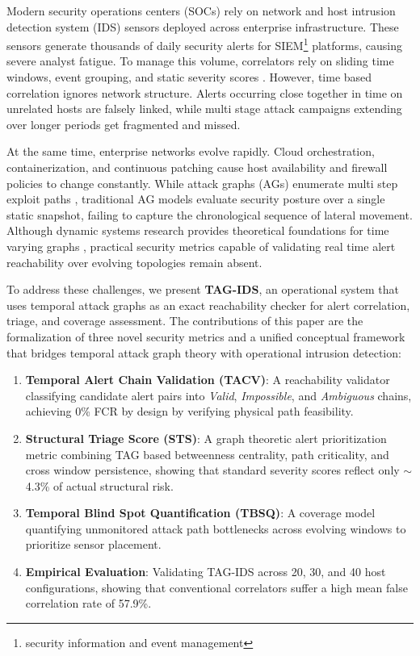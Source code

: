 \documentclass[runningheads]{llncs}
\begin{document}
Modern security operations centers (SOCs) rely on network and host intrusion detection system (IDS) sensors deployed across enterprise infrastructure. These sensors generate thousands of daily security alerts for SIEM\footnote{security information and event management} platforms, causing severe analyst fatigue. To manage this volume, correlators rely on sliding time windows, event grouping, and static severity scores \cite{10.1145/586110.586144,1366134,s22041494}. However, time based correlation ignores network structure. Alerts occurring close together in time on unrelated hosts are falsely linked, while multi stage attack campaigns extending over longer periods get fragmented and missed.

At the same time, enterprise networks evolve rapidly. Cloud orchestration, containerization, and continuous patching cause host availability and firewall policies to change constantly. While attack graphs (AGs) enumerate multi step exploit paths \cite{1004377,6263942}, traditional AG models evaluate security posture over a single static snapshot, failing to capture the chronological sequence of lateral movement. Although dynamic systems research provides theoretical foundations for time varying graphs \cite{Casteigts2012,Holme}, practical security metrics capable of validating real time alert reachability over evolving topologies remain absent.

To address these challenges, we present \textbf{TAG-IDS}, an operational system that uses temporal attack graphs \cite{Gain2023} as an exact reachability checker for alert correlation, triage, and coverage assessment. The contributions of this paper are the formalization of three novel security metrics and a unified conceptual framework that bridges temporal attack graph theory with operational intrusion detection:
\begin{enumerate}\setlength{\itemsep}{1pt}\setlength{\parskip}{0pt}
	\item \textbf{Temporal Alert Chain Validation (TACV)}: A reachability validator classifying candidate alert pairs into \emph{Valid}, \emph{Impossible}, and \emph{Ambiguous} chains, achieving 0\% FCR by design by verifying physical path feasibility.
	\item \textbf{Structural Triage Score (STS)}: A graph theoretic alert prioritization metric combining TAG based betweenness centrality, path criticality, and cross window persistence, showing that standard severity scores reflect only $\sim$4.3\% of actual structural risk.
	\item \textbf{Temporal Blind Spot Quantification (TBSQ)}: A coverage model quantifying unmonitored attack path bottlenecks across evolving windows to prioritize sensor placement.
	\item \textbf{Empirical Evaluation}: Validating TAG-IDS across 20, 30, and 40 host configurations, showing that conventional correlators suffer a high mean false correlation rate of 57.9\%.
\end{enumerate}
\end{document}
